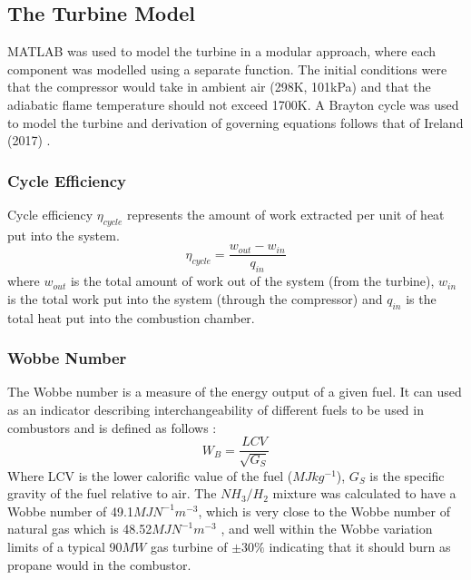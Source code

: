 \subsection{The Turbine Model}
MATLAB was used to model the turbine in a modular approach, where each component was modelled using a separate function. The initial conditions were that the compressor would take in ambient air (298K, 101kPa) and that the adiabatic flame temperature should not exceed 1700K. A Brayton cycle was used to model the turbine and derivation of governing equations follows that of Ireland (2017) \cite{thermonotes}.

\subsubsection{Cycle Efficiency}
Cycle efficiency $\eta_{cycle}$ represents the amount of work extracted per unit of heat put into the system.
\begin{equation}
\eta_{cycle} = \frac{w_{out} - w_{in}}{q_{in}}
\end{equation}
where $w_{out}$ is the total amount of work out of the system (from the turbine), $w_{in}$ is the total work put into the system (through the compressor) and $q_{in}$ is the total heat put into the combustion chamber.

\subsubsection{Wobbe Number} 
The Wobbe number is a measure of the energy output of a given fuel. It can used as an indicator describing interchangeability of different fuels to be used in combustors and is defined as follows \cite{website:wobbe}: 
\begin{equation}
W_B = \frac{LCV}{\sqrt{G_S}}
\end{equation}
Where LCV is the lower calorific value of the fuel ($MJ kg^{-1}$), $G_S$ is the specific gravity of the fuel relative to air. The $NH_3/H_2$ mixture was calculated to have a Wobbe number of 49.1$MJN^{-1}m^{-3}$, which is very close to the Wobbe number of natural gas which is 48.52$MJN^{-1}m^{-3}$ \cite{website:wobbe}, and well within the Wobbe variation limits of a typical 90$MW$ gas turbine of $\pm 30\%$ \cite{PDF:GE} indicating that it should burn as propane would in the combustor. 

